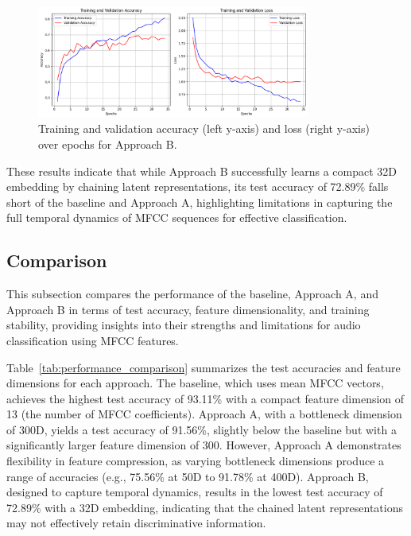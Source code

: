 \documentclass[12pt]{article}
\begin{document}
\begin{figure}[h]
    \centering
    \includegraphics[width=0.8\textwidth]{train_b.png}
    \caption{Training and validation accuracy (left y-axis) and loss (right y-axis) over epochs for Approach B.}
    \label{fig:train_progress_b}
\end{figure}

These results indicate that while Approach B successfully learns a compact 32D embedding by chaining latent representations, its test accuracy of 72.89\% falls short of the baseline and Approach A, highlighting limitations in capturing the full temporal dynamics of MFCC sequences for effective classification.

\subsection{Comparison}

This subsection compares the performance of the baseline, Approach A, and Approach B in terms of test accuracy, feature dimensionality, and training stability, providing insights into their strengths and limitations for audio classification using MFCC features.

Table~\ref{tab:performance_comparison} summarizes the test accuracies and feature dimensions for each approach. The baseline, which uses mean MFCC vectors, achieves the highest test accuracy of 93.11\% with a compact feature dimension of 13 (the number of MFCC coefficients). Approach A, with a bottleneck dimension of 300D, yields a test accuracy of 91.56\%, slightly below the baseline but with a significantly larger feature dimension of 300. However, Approach A demonstrates flexibility in feature compression, as varying bottleneck dimensions produce a range of accuracies (e.g., 75.56\% at 50D to 91.78\% at 400D). Approach B, designed to capture temporal dynamics, results in the lowest test accuracy of 72.89\% with a 32D embedding, indicating that the chained latent representations may not effectively retain discriminative information.
\end{document}
